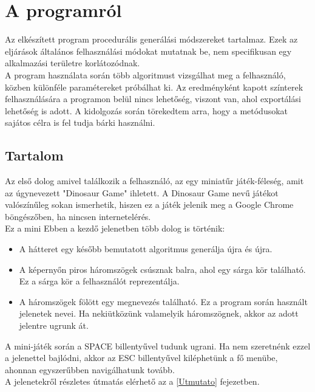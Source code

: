 

\chapter{A programról}
Az elkészített program procedurális generálási módszereket tartalmaz. Ezek az eljárások általános felhasználási módokat mutatnak be, nem specifikusan egy alkalmazási területre korlátozódnak.\\
A program használata során több algoritmust vizsgálhat meg a felhasználó, közben különféle paramétereket próbálhat ki. Az eredményként kapott színterek felhasználására a programon belül nincs lehetőség, viszont van, ahol exportálási lehetőség is adott. A kidolgozás során törekedtem arra, hogy a metódusokat sajátos célra is fel tudja bárki használni. 

\section{Tartalom}
Az első dolog amivel találkozik a felhasználó, az egy miniatűr játék-féleség, amit az úgynevezett "Dinosaur Game" ihletett. A Dinosaur Game nevű játékot valószínűleg sokan ismerhetik, hiszen ez a játék jelenik meg a Google Chrome böngészőben, ha nincsen internetelérés.\\
Ez a mini
Ebben a kezdő jelenetben több dolog is történik:
\begin{itemize}
    \item A hátteret egy később bemutatott algoritmus generálja újra és újra.
    \item A képernyőn piros háromszögek csúsznak balra, ahol egy sárga kör található. Ez a sárga kör a felhasználót reprezentálja.
    \item A háromszögek fölött egy megnevezés található. Ez a program során használt jelenetek nevei. Ha nekiütközünk valamelyik háromszögnek, akkor az adott jelentre ugrunk át.
\end{itemize}
A mini-játék során a SPACE billentyűvel tudunk ugrani. Ha nem szeretnénk ezzel a jelenettel bajlódni, akkor az ESC billentyűvel kiléphetünk a fő menübe, ahonnan egyszerűbben navigálhatunk tovább.\\
A jelenetekről részletes útmatás elérhető az a \ref{Utmutato} fejezetben.
